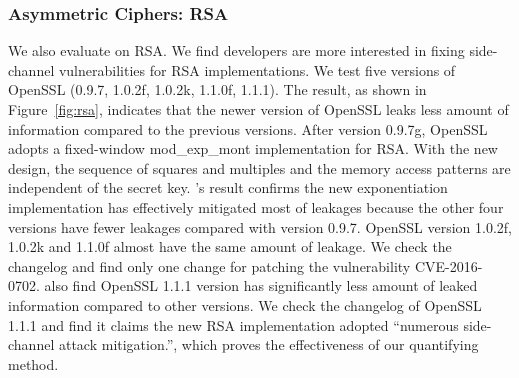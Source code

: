 \subsubsection{Asymmetric Ciphers: RSA}\label{eval:asym}
We also evaluate \tool{} on RSA.  We find developers are more interested in 
fixing side-channel vulnerabilities for RSA implementations. 
We test five versions of OpenSSL (0.9.7, 1.0.2f, 1.0.2k, 1.1.0f, 1.1.1). The
result, as shown in Figure~\ref{fig:rsa}, indicates that the newer
version of OpenSSL leaks less amount of information compared to the previous
versions. After version 0.9.7g, OpenSSL adopts a fixed-window \textsf{mod\_exp\_mont}
implementation for RSA\@. With the new design, the sequence of squares and
multiples and the memory access patterns are independent of the secret key.
\tool{}'s result confirms the new exponentiation implementation has 
effectively mitigated most of leakages because the other four versions have fewer
leakages compared with version 0.9.7. 
OpenSSL version 1.0.2f, 1.0.2k and 1.1.0f almost have the
same amount of leakage. We check the changelog and find only one change for
patching the vulnerability CVE-2016-0702. 
\tool{} also find OpenSSL 1.1.1 version has significantly less amount of 
leaked information compared to other versions.
We check the changelog of OpenSSL 1.1.1 and find it claims
the new RSA implementation adopted ``numerous side-channel attack mitigation.'', 
which proves the effectiveness of our quantifying method.

